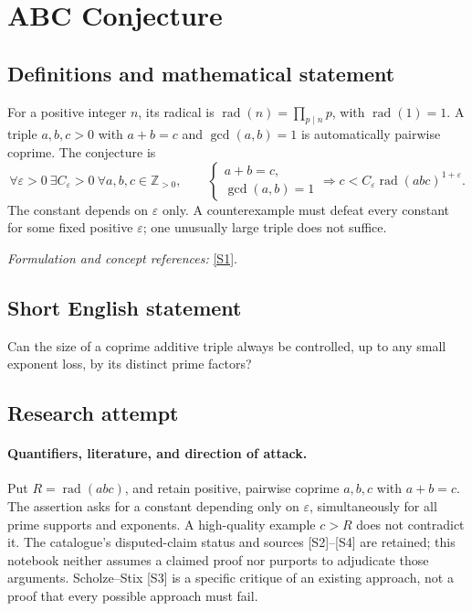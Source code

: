 \documentclass[11pt]{article}
\begin{document}
\section*{\texorpdfstring{ABC Conjecture}{ABC Conjecture}}\label{13}
\subsection{Definitions and mathematical statement}
For a positive integer $n$, its radical is $\operatorname{rad}(n)=\prod_{p\mid n}p$, with $\operatorname{rad}(1)=1$. A triple $a,b,c>0$ with $a+b=c$ and $\gcd(a,b)=1$ is automatically pairwise coprime. The conjecture is
\[
 \forall\varepsilon>0\ \exists C_\varepsilon>0\ \forall a,b,c\in{\mathbb{Z}}_{>0},\qquad
 \begin{cases}a+b=c,\\\gcd(a,b)=1\end{cases}
 \Longrightarrow c<C_\varepsilon\operatorname{rad}(abc)^{1+\varepsilon}.
\]
The constant depends on $\varepsilon$ only. A counterexample must defeat every constant for some fixed positive $\varepsilon$; one unusually large triple does not suffice.
\par\smallskip\textit{Formulation and concept references:} \href{https://link.springer.com/article/10.1007/s00025-026-02616-5}{[S1]}.

\subsection{Short English statement}
Can the size of a coprime additive triple always be controlled, up to any small exponent loss, by its distinct prime factors?
\subsection{Research attempt}

\paragraph{Quantifiers, literature, and direction of attack.}
Put $R=\operatorname{rad}(abc)$, and retain positive, pairwise coprime
$a,b,c$ with $a+b=c$. The assertion asks for a constant depending only
on $\varepsilon$, simultaneously for all prime supports and exponents.
A high-quality example $c>R$ does not contradict it. The catalogue's
disputed-claim status and sources [S2]--[S4] are retained; this notebook
neither assumes a claimed proof nor purports to adjudicate those arguments.
Scholze--Stix [S3] is a specific critique of an existing approach, not a
proof that every possible approach must fail.
\end{document}

